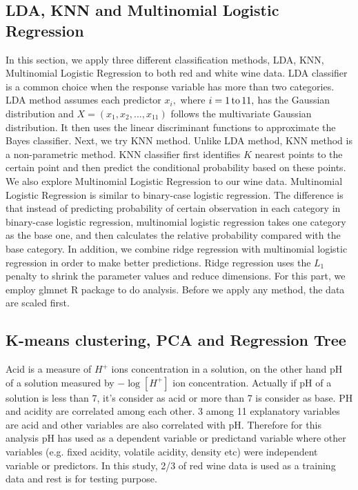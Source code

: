 \documentclass[12pt]{article}
\begin{document}
\subsection{LDA, KNN and Multinomial Logistic Regression}
In this section, we apply three different classification methods, LDA, KNN, Multinomial Logistic Regression
to both red and white wine data. LDA classifier is a common choice when the response variable has more than two categories. LDA method assumes each predictor $x_i,$ where $i=1 \,{\rm to}\, 11,$ has the Gaussian distribution and $X=(x_1,x_2,...,x_{11})$ follows the multivariate Gaussian distribution. It then uses the linear discriminant functions
to approximate the Bayes classifier.
Next, we try KNN method. Unlike LDA method, KNN method is a non-parametric method. KNN classifier first identifies $K$ nearest points to the certain point and then predict the conditional probability based on these points.
We also explore Multinomial Logistic Regression to our wine data. Multinomial Logistic Regression is similar to binary-case logistic regression. The difference is that instead of predicting probability of certain observation in each category in binary-case logistic regression, multinomial logistic regression takes one category as the base one, and then calculates the relative probability compared with the base category. In addition, we combine ridge regression with multinomial logistic regression in order to make better predictions. Ridge regression uses the $L_1$ penalty to shrink the parameter values and reduce dimensions. For this part, we employ glmnet R package to do analysis. Before we apply any method, the data are scaled first.


\subsection{K-means clustering, PCA and Regression Tree}
Acid is a measure of $H^{+}$ ions concentration in a solution, on the other hand pH of a solution measured by
$-\log[H^{+}]$ ion concentration. Actually if pH of a solution is less than 7, it's consider as acid or more than
7 is consider as base. PH and acidity are correlated among each other.  3 among 11 explanatory variables are acid
and other variables are also correlated with pH.
Therefore for this analysis pH has used as a dependent variable or predictand variable where other variables
(e.g. fixed acidity, volatile acidity, density etc) were independent variable or predictors. In this study, 2/3
of red wine data is used as a training data and rest is for testing purpose.
\end{document}
